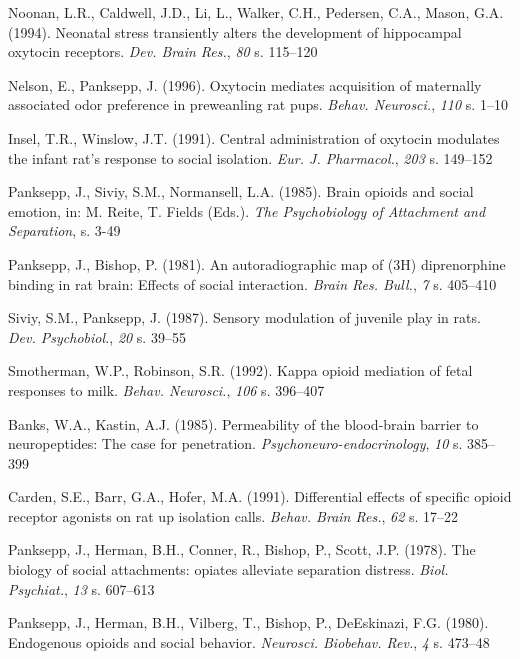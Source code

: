 \documentclass[12pt]{article}
\newcommand{\apaartykul}[6]{#1 (#2). #3. \textit{#4}, \textit{#5} s. #6}
\begin{document}
\apaartykul{Noonan, L.R., Caldwell, J.D., Li, L., Walker, C.H., Pedersen, C.A., Mason, G.A.}{1994}{Neonatal stress transiently alters the development of hippocampal oxytocin receptors}{Dev. Brain Res.}{80}{115–120}

\apaartykul{Nelson, E., Panksepp, J.}{1996}{Oxytocin mediates acquisition of maternally associated odor preference in preweanling rat pups}{Behav. Neurosci.}{110}{1–10}

\apaartykul{ Insel, T.R., Winslow, J.T.}{1991}{Central administration of oxytocin modulates the infant rat’s response to social isolation}{Eur. J. Pharmacol.}{203}{149–152}

\apaartykul{Panksepp, J., Siviy, S.M., Normansell, L.A.}{1985}{Brain opioids and social emotion, in: M. Reite, T. Fields (Eds.)}{The Psychobiology of Attachment and Separation}{}{3-49}

\apaartykul{Panksepp, J., Bishop, P.}{1981}{An autoradiographic map of (3H) diprenorphine binding in rat brain: Effects of social interaction}{Brain Res. Bull.}{7}{405–410}

\apaartykul{Siviy, S.M., Panksepp, J.}{1987}{Sensory modulation of juvenile play in rats}{Dev. Psychobiol.}{20}{39–55}

\apaartykul{Smotherman, W.P., Robinson, S.R.}{1992}{Kappa opioid mediation of fetal responses to milk}{Behav. Neurosci.}{106}{396–407}

\apaartykul{Banks, W.A., Kastin, A.J.}{1985}{Permeability of the blood-brain barrier to neuropeptides: The case for penetration}{Psychoneuro-endocrinology}{10}{385–399}

\apaartykul{Carden, S.E., Barr, G.A., Hofer, M.A.}{1991}{Differential effects of specific opioid receptor agonists on rat up isolation calls}{Behav. Brain Res.}{62}{17–22}

\apaartykul{Panksepp, J., Herman, B.H., Conner, R., Bishop, P., Scott, J.P.}{1978}{The biology of social attachments: opiates alleviate separation distress}{Biol. Psychiat.}{13}{607–613}

\apaartykul{Panksepp, J., Herman, B.H., Vilberg, T., Bishop, P., DeEskinazi, F.G.}{1980}{Endogenous opioids and social behavior}{Neurosci. Biobehav. Rev.}{4}{473–48}
\end{document}
